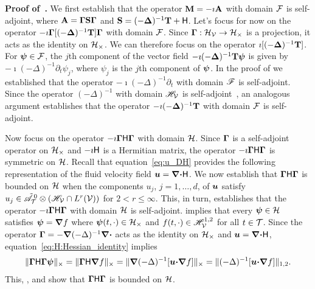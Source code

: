 \documentclass[amsa]{ipart}
\begin{document}
\textbf{Proof of~.}\hspace{1ex}
%
We first establish that the operator $\mathbf{M}=-\imath \mathbf{A}$ with domain
$\mathcal{F}$ is self-adjoint, where
$\mathbf{A}=\mbox{\boldmath${\Gamma}$}\mathbf{S}\mbox{\boldmath${\Gamma}$}$ and $\mathbf{S}=(-\mbox{\boldmath${\Delta}$})^{-1}\mathbf{T}+\mathsf{H}$. Let's focus
for now on the operator $-\imath\mbox{\boldmath${\Gamma}$}[(-\mbox{\boldmath${\Delta}$})^{-1}\mathbf{T}]\mbox{\boldmath${\Gamma}$}$
with domain $\mathcal{F}$. Since $\mbox{\boldmath${\Gamma}$}:\mathcal{H}_{\mathcal{V}}\to\mathcal{H}_\times$ is
a projection, it acts as the identity on $\mathcal{H}_\times$. We can therefore
focus on the operator $\imath[(-\mbox{\boldmath${\Delta}$})^{-1}\mathbf{T}]$. For $\mbox{\boldmath${\psi}$}\in\mathcal{F}$, the
$j$th component of the vector field $-\imath(-\mbox{\boldmath${\Delta}$})^{-1}\mathbf{T}\mbox{\boldmath${\psi}$}$ is
given by $-\imath(-\Delta)^{-1}\partial_t\psi_j$, where $\psi_j$ is the $j$th component of
$\mbox{\boldmath${\psi}$}$. In the proof of  we established
that the operator $-\imath(-\Delta)^{-1}\partial_t$ with domain $\mathscr{F}$ is
self-adjoint. Since the operator $(-\Delta)^{-1}$ with domain $\mathscr{H}_{\mathcal{V}}$ is
self-adjoint~\cite{Stakgold:BVP:2000}, an analogous argument
establishes that the operator $-\imath(-\mbox{\boldmath${\Delta}$})^{-1}\mathbf{T}$ with domain $\mathcal{F}$
is self-adjoint.   



Now focus on the operator $-\imath\mbox{\boldmath${\Gamma}$}\mathsf{H}\mbox{\boldmath${\Gamma}$}$ with domain
$\mathcal{H}$. Since $\mbox{\boldmath${\Gamma}$}$ is a self-adjoint operator on $\mathcal{H}_\times$ and
$-\imath\mathsf{H}$ is a Hermitian matrix, the operator $-\imath\mbox{\boldmath${\Gamma}$}\mathsf{H}\mbox{\boldmath${\Gamma}$}$ is
symmetric on $\mathcal{H}$. Recall that equation~\eqref{eq:u_DH} provides the
following representation of the fluid velocity field
$\boldsymbol{u}=\mbox{\boldmath${\nabla}$}\mbox{\boldmath${\cdot}$}\mathsf{H}$. We now establish that $\mbox{\boldmath${\Gamma}$}\mathsf{H}\mbox{\boldmath${\Gamma}$}$ is 
bounded on $\mathcal{H}$ when the components $u_j$, $j=1,\ldots,d$, of $\boldsymbol{u}$
satisfy $u_j\in\tilde{\mathscr{A}}^{\,0}_{\mathcal{T}}\otimes(\mathscr{H}_{\mathcal{V}}\cap L^r(\mathcal{V}))$ for 
$2<r\leq\infty$. This, in turn, establishes that the operator
$-\imath\mbox{\boldmath${\Gamma}$}\mathsf{H}\mbox{\boldmath${\Gamma}$}$ with domain $\mathcal{H}$ is
self-adjoint.  implies that every $\mbox{\boldmath${\psi}$}\in\mathcal{H}$
satisfies $\boldsymbol{\psi}=\mbox{\boldmath${\nabla}$} f$ where $\mbox{\boldmath${\psi}$}(t,\cdot)\in\mathcal{H}_\times$ and
$f(t,\cdot)\in\mathscr{H}^{1,2}_{\mathcal{V}}$ for all $t\in\mathcal{T}$. Since the operator
$\mbox{\boldmath${\Gamma}$}=-\mbox{\boldmath${\nabla}$}(-\Delta)^{-1}\mbox{\boldmath${\nabla}$}\mbox{\boldmath${\cdot}$}$ acts as the identity on
$\mathcal{H}_\times$ and $\boldsymbol{u}=\mbox{\boldmath${\nabla}$}\mbox{\boldmath${\cdot}$}\mathsf{H}$,
equation~\eqref{eq:H:Hessian_identity} implies 
%
\begin{align}
  \|\bGamma\Hm\bGamma\bpsi\|_\times
  =\|\bGamma\Hm\bnabla f\|_\times
  =\|\bnabla(-\Delta)^{-1}[\vecu\bcdot\bnabla f]\|_\times
  =\|(-\Delta)^{-1}[\vecu\bcdot\bnabla f]\|_{1,2}.
\end{align}
%
This, , and  show
that $\mbox{\boldmath${\Gamma}$}\mathsf{H}\mbox{\boldmath${\Gamma}$}$ is bounded on $\mathcal{H}$.
\end{document}

